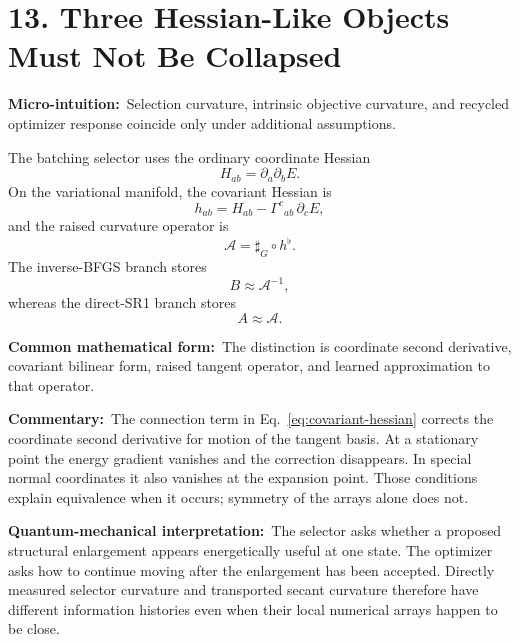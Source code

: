\documentclass[10pt,twocolumn]{article}
\newcommand{\micro}[1]{\par\noindent\textbf{Micro-intuition:}\ #1\par}
\newcommand{\form}[1]{\par\noindent\textbf{Common mathematical form:}\ #1\par}
\newcommand{\commentary}[1]{\par\noindent\textbf{Commentary:}\ #1\par}
\newcommand{\phys}[1]{\par\noindent\textbf{Quantum-mechanical interpretation:}\ #1\par}
\newcommand{\conceptbreak}{\par\medskip\noindent{\color{black!30}\rule{\columnwidth}{0.35pt}}\par\medskip}
\begin{document}
\conceptbreak

\section*{13. Three Hessian-Like Objects Must Not Be Collapsed}

\micro{Selection curvature, intrinsic objective curvature, and recycled
optimizer response coincide only under additional assumptions.}

The batching selector uses the ordinary coordinate Hessian
\begin{equation}
H_{ab}=\partial_a\partial_bE.
\label{eq:ordinary-hessian}
\end{equation}
On the variational manifold, the covariant Hessian is
\begin{equation}
h_{ab}=H_{ab}-\Gamma^c{}_{ab}\,\partial_cE,
\label{eq:covariant-hessian}
\end{equation}
and the raised curvature operator is
\begin{equation}
\mathcal A=\sharp_G\circ h^\flat.
\label{eq:raised-hessian}
\end{equation}
The inverse-BFGS branch stores
\begin{equation}
B\approx\mathcal A^{-1},
\label{eq:optimizer-inverse-curvature}
\end{equation}
whereas the direct-SR1 branch stores
\begin{equation}
A\approx\mathcal A.
\label{eq:optimizer-direct-curvature}
\end{equation}

\form{The distinction is coordinate second derivative, covariant bilinear
form, raised tangent operator, and learned approximation to that operator.}

\commentary{The connection term in Eq.~\eqref{eq:covariant-hessian} corrects
the coordinate second derivative for motion of the tangent basis. At a
stationary point the energy gradient vanishes and the correction disappears.
In special normal coordinates it also vanishes at the expansion point. Those
conditions explain equivalence when it occurs; symmetry of the arrays alone
does not.}

\phys{The selector asks whether a proposed structural enlargement appears
energetically useful at one state. The optimizer asks how to continue moving
after the enlargement has been accepted. Directly measured selector curvature
and transported secant curvature therefore have different information histories
even when their local numerical arrays happen to be close.}
\end{document}
